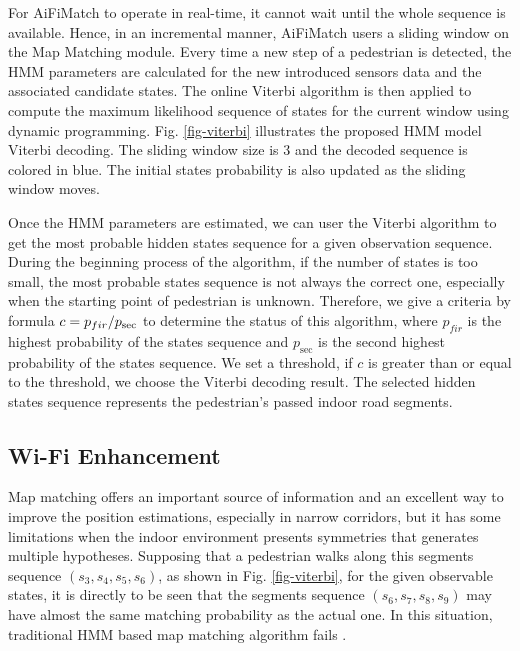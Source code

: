\documentclass[conference]{IEEEtran}
\begin{document}
For AiFiMatch to operate in real-time, it cannot wait until the whole sequence is available. Hence, in an incremental manner, AiFiMatch users a sliding window on the Map Matching module. Every time a new step of a pedestrian is detected, the HMM parameters are calculated for the new introduced sensors data and the associated candidate states. The online Viterbi algorithm \cite{bloit2008short} is then applied to compute the maximum likelihood sequence of states for the current window using dynamic programming. Fig. \ref{fig-viterbi} illustrates the proposed HMM model Viterbi decoding. The sliding window size is $3$ and the decoded sequence is colored in blue. The initial states probability is also updated as the sliding window moves.

Once the HMM parameters are estimated, we can user the Viterbi algorithm to get the most probable hidden states sequence for a given observation sequence. During the beginning process of the algorithm, if the number of states is too small, the most probable states sequence is not always the correct one, especially when the starting point of pedestrian is unknown. Therefore, we give a criteria by formula $c = {{{p_{fir}}} \mathord{\left/
		{\vphantom {{{p_{fir}}} {{p_{\sec }}}}} \right.
		\kern-\nulldelimiterspace} {{p_{\sec }}}}$ to determine the status of this algorithm, where ${p_{fir}}$ is the highest probability of the states sequence and ${p_{\sec }}$ is the second highest probability of the states sequence. We set a threshold, if $c$ is greater than or equal to the threshold, we choose the Viterbi decoding result. The selected hidden states sequence represents the pedestrian's passed indoor road segments.

\subsection{Wi-Fi Enhancement}
Map matching offers an important source of information and an excellent way to improve the position estimations, especially in narrow corridors, but it has some limitations when the indoor environment presents symmetries that generates multiple hypotheses. Supposing that a pedestrian walks along this segments sequence $(s_3, s_4, s_5, s_6)$, as shown in Fig. \ref{fig-viterbi}, for the given observable states, it is directly to be seen that the segments sequence $(s_6, s_7, s_8, s_9)$ may have almost the same matching probability as the actual one. In this situation, traditional HMM based map matching algorithm fails \cite{zhou2015activity}.
\end{document}
